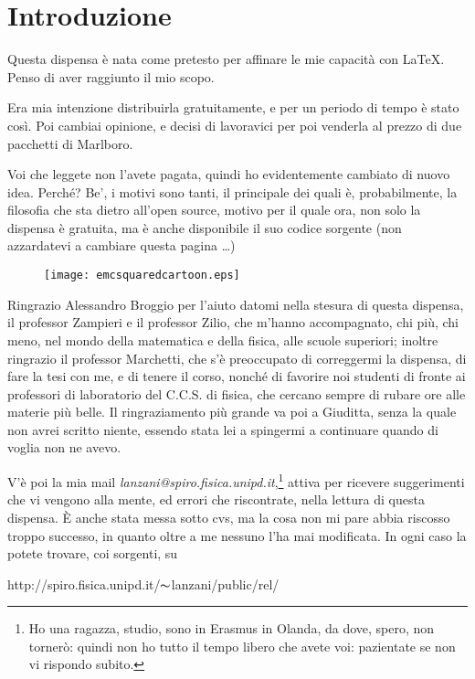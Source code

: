 \chapter*{Introduzione}
\begin{flushright}
\end{flushright}

Questa dispensa \`e nata come pretesto per affinare le mie capacit\`a
con \LaTeX. Penso di aver raggiunto il mio scopo.

Era mia intenzione distribuirla gratuitamente, e per un periodo di tempo
\`e stato cos\`i. Poi cambiai opinione, e decisi di lavoravici per poi
venderla al prezzo di due pacchetti di Marlboro.

Voi che leggete non l'avete pagata, quindi ho evidentemente cambiato di
nuovo idea. Perch\'e? Be', i motivi sono tanti, il principale dei quali
\`e, probabilmente, la filosofia che sta dietro all'open source, motivo
per il quale ora, non solo la dispensa \`e gratuita, ma \`e anche
disponibile il suo codice sorgente (non azzardatevi a cambiare questa
pagina \ldots)

\begin{wrapfigure}[10]{r}{4cm}
\texttt{[image: emcsquaredcartoon.eps]}
\end{wrapfigure}

Ringrazio Alessandro Broggio per l'aiuto datomi nella stesura di questa
dispensa, il professor Zampieri e il professor Zilio, che m'hanno
accompagnato, chi pi\`u, chi meno, nel mondo della matematica e della
fisica, alle scuole superiori; inoltre ringrazio il professor Marchetti,
che s'\`e preoccupato di correggermi la dispensa, di fare la tesi con
me, e di tenere il corso, nonch\'e di favorire noi studenti di fronte ai
professori di laboratorio del C.C.S. di fisica, che cercano sempre di
rubare ore alle materie pi\`u belle. Il ringraziamento pi\`u grande va
poi a Giuditta, senza la quale non avrei scritto niente, essendo stata
lei a spingermi a continuare quando di voglia non ne avevo.

V'\`e poi la mia mail \emph{lanzani@spiro.fisica.unipd.it},\footnote{Ho
una ragazza, studio, sono in Erasmus in Olanda, da dove,
spero, non torner\`o: quindi non ho tutto il tempo libero che avete voi:
pazientate se non vi rispondo subito.} attiva per ricevere suggerimenti
che vi vengono alla mente, ed errori che riscontrate, nella lettura di
questa dispensa. \`E anche stata messa sotto cvs, ma la cosa non mi pare
abbia riscosso troppo successo, in quanto oltre a me nessuno l'ha mai
modificata. In ogni caso la potete trovare, coi sorgenti, su
\begin{center}
	http://spiro.fisica.unipd.it/$\thicksim$lanzani/public/rel/
\end{center}

